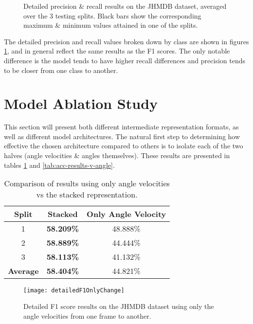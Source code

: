 \begin{figure}[ht]
	\centering
	\caption{Detailed precision \& recall results on the JHMDB dataset, averaged over the 3 testing splits. Black bars show the corresponding maximum \& minimum values attained in one of the splits.}
	\label{fig:detailed-recall-precision}
\end{figure}

The detailed precision and recall values broken down by class are shown in figures \ref{fig:detailed-recall-precision}, and in general reflect the same results as the F1 scores. The only notable difference is the model tends to have higher recall differences and precision tends to be closer from one class to another.

\section{Model Ablation Study}

This section will present both different intermediate representation formats, as well as different model architectures. The natural first step to determining how effective the chosen architecture compared to others is to isolate each of the two halves (angle velocities \& angles themselves). These results are presented in tables \ref{tab:acc-results-v-velocity} and \ref{tab:acc-results-v-angle}.

\begin{table}[ht]
	\centering
	\begin{tabular}{||c c c||} 
		\hline
		\textbf{Split} & \textbf{Stacked} & \textbf{Only Angle Velocity} \\ [0.5ex] 
		\hline\hline
		1 & \textbf{58.209\%} & 48.888\% \\ 
		\hline
		2 & \textbf{58.889\%} & 44.444\% \\
		\hline
		3 & \textbf{58.113\%} & 41.132\% \\
		\hline
		\hline
		\textbf{Average} & \textbf{58.404\%} & 44.821\% \\
		\hline
	\end{tabular}
	\caption{Comparison of results using only angle velocities vs the stacked representation.}
	\label{tab:acc-results-v-velocity}
\end{table}

\begin{figure}[ht]
	\texttt{[image: detailedF1OnlyChange]}
	\centering
	\caption{Detailed F1 score results on the JHMDB dataset using only the angle velocities from one frame to another.}
	\label{fig:detailed-f1-only-change}
\end{figure}

